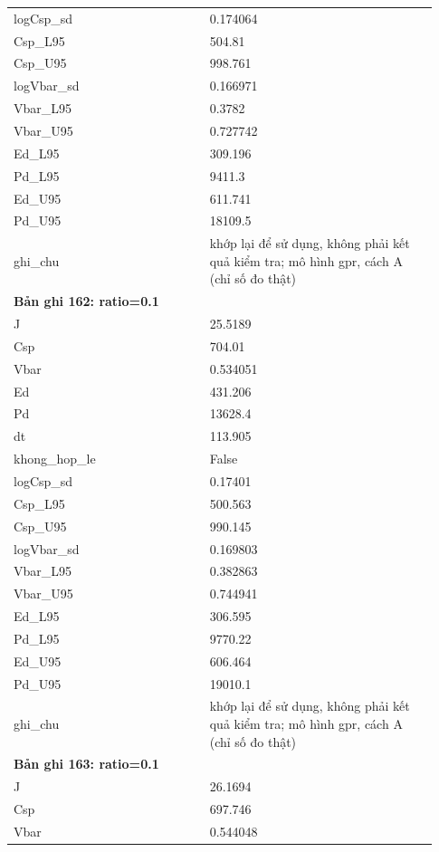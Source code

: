 \begin{longtable}{p{0.43\linewidth}p{0.50\linewidth}}
logCsp\_\allowbreak sd & 0.174064 \\
Csp\_\allowbreak L95 & 504.81 \\
Csp\_\allowbreak U95 & 998.761 \\
logVbar\_\allowbreak sd & 0.166971 \\
Vbar\_\allowbreak L95 & 0.3782 \\
Vbar\_\allowbreak U95 & 0.727742 \\
Ed\_\allowbreak L95 & 309.196 \\
Pd\_\allowbreak L95 & 9411.3 \\
Ed\_\allowbreak U95 & 611.741 \\
Pd\_\allowbreak U95 & 18109.5 \\
ghi\_\allowbreak chu & khớp lại để sử dụng, không phải kết quả kiểm tra; mô hình gpr, cách A (chỉ số đo thật) \\
\midrule
\multicolumn{2}{p{0.95\linewidth}}{\textbf{Bản ghi 162: ratio=0.1}} \\
J & 25.5189 \\
Csp & 704.01 \\
Vbar & 0.534051 \\
Ed & 431.206 \\
Pd & 13628.4 \\
dt & 113.905 \\
khong\_\allowbreak hop\_\allowbreak le & False \\
logCsp\_\allowbreak sd & 0.17401 \\
Csp\_\allowbreak L95 & 500.563 \\
Csp\_\allowbreak U95 & 990.145 \\
logVbar\_\allowbreak sd & 0.169803 \\
Vbar\_\allowbreak L95 & 0.382863 \\
Vbar\_\allowbreak U95 & 0.744941 \\
Ed\_\allowbreak L95 & 306.595 \\
Pd\_\allowbreak L95 & 9770.22 \\
Ed\_\allowbreak U95 & 606.464 \\
Pd\_\allowbreak U95 & 19010.1 \\
ghi\_\allowbreak chu & khớp lại để sử dụng, không phải kết quả kiểm tra; mô hình gpr, cách A (chỉ số đo thật) \\
\midrule
\multicolumn{2}{p{0.95\linewidth}}{\textbf{Bản ghi 163: ratio=0.1}} \\
J & 26.1694 \\
Csp & 697.746 \\
Vbar & 0.544048 \\

\end{longtable}
